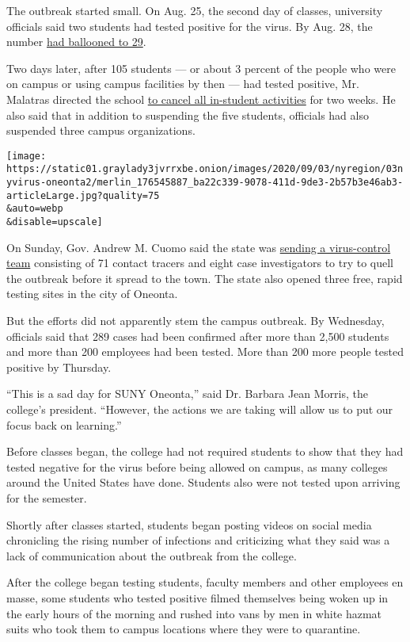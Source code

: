 The outbreak started small. On Aug. 25, the second day of classes,
university officials said two students had tested positive for the
virus. By Aug. 28, the number
\href{https://t.e2ma.net/message/5vr3cc/96qt6se}{had ballooned to 29}.

Two days later, after 105 students --- or about 3 percent of the people
who were on campus or using campus facilities by then --- had tested
positive, Mr. Malatras directed the school
\href{https://t.e2ma.net/message/pvgadc/96qt6se}{to cancel all
in-student activities} for two weeks. He also said that in addition to
suspending the five students, officials had also suspended three campus
organizations.

\texttt{[image: https://static01.graylady3jvrrxbe.onion/images/2020/09/03/nyregion/03nyvirus-oneonta2/merlin\_176545887\_ba22c339-9078-411d-9de3-2b57b3e46ab3-articleLarge.jpg?quality=75\\\&auto=webp\\\&disable=upscale]}

On Sunday, Gov. Andrew M. Cuomo said the state was
\href{https://www.governor.ny.gov/news/governor-cuomo-deploys-swat-team-suny-oneonta-contain-covid-19-cluster}{sending
a virus-control team} consisting of 71 contact tracers and eight case
investigators to try to quell the outbreak before it spread to the town.
The state also opened three free, rapid testing sites in the city of
Oneonta.

But the efforts did not apparently stem the campus outbreak. By
Wednesday, officials said that 289 cases had been confirmed after more
than 2,500 students and more than 200 employees had been tested. More
than 200 more people tested positive by Thursday.

``This is a sad day for SUNY Oneonta,'' said Dr. Barbara Jean Morris,
the college's president. ``However, the actions we are taking will allow
us to put our focus back on learning.''

Before classes began, the college had not required students to show that
they had tested negative for the virus before being allowed on campus,
as many colleges around the United States have done. Students also were
not tested upon arriving for the semester.

Shortly after classes started, students began posting videos on social
media chronicling the rising number of infections and criticizing what
they said was a lack of communication about the outbreak from the
college.

After the college began testing students, faculty members and other
employees en masse, some students who tested positive filmed themselves
being woken up in the early hours of the morning and rushed into vans by
men in white hazmat suits who took them to campus locations where they
were to quarantine.

